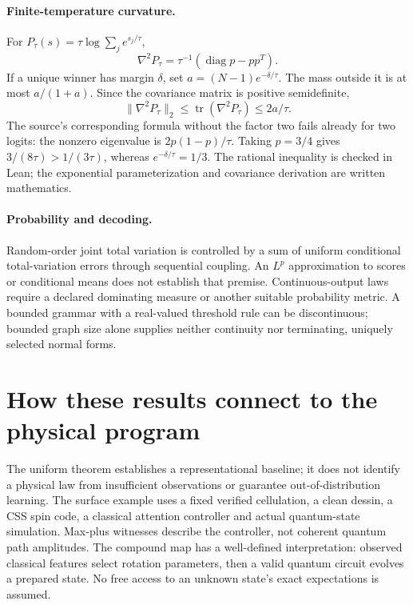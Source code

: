\paragraph{Finite-temperature curvature.} For $P_\tau(s)=\tau\log\sum_j e^{s_j/\tau}$,
\[
 \nabla^2P_\tau=\tau^{-1}(\operatorname{diag}p-pp^T).
\]
If a unique winner has margin $\delta$, set $a=(N-1)e^{-\delta/\tau}$. The mass outside it is at most $a/(1+a)$. Since the covariance matrix is positive semidefinite,
\[
 \|\nabla^2P_\tau\|_2\le\operatorname{tr}(\nabla^2P_\tau)
 \le 2a/\tau.
\]
The source's corresponding formula without the factor two fails already for two logits: the nonzero eigenvalue is $2p(1-p)/\tau$. Taking $p=3/4$ gives $3/(8\tau)>1/(3\tau)$, whereas $e^{-\delta/\tau}=1/3$. The rational inequality is checked in Lean; the exponential parameterization and covariance derivation are written mathematics.

\paragraph{Probability and decoding.} Random-order joint total variation is controlled by a sum of uniform conditional total-variation errors through sequential coupling. An $L^p$ approximation to scores or conditional means does not establish that premise. Continuous-output laws require a declared dominating measure or another suitable probability metric. A bounded grammar with a real-valued threshold rule can be discontinuous; bounded graph size alone supplies neither continuity nor terminating, uniquely selected normal forms.

\section{How these results connect to the physical program}

The uniform theorem establishes a representational baseline; it does not identify a physical law from insufficient observations or guarantee out-of-distribution learning. The surface example uses a fixed verified cellulation, a clean dessin, a CSS spin code, a classical attention controller and actual quantum-state simulation. Max-plus witnesses describe the controller, not coherent quantum path amplitudes. The compound map has a well-defined interpretation: observed classical features select rotation parameters, then a valid quantum circuit evolves a prepared state. No free access to an unknown state's exact expectations is assumed.

